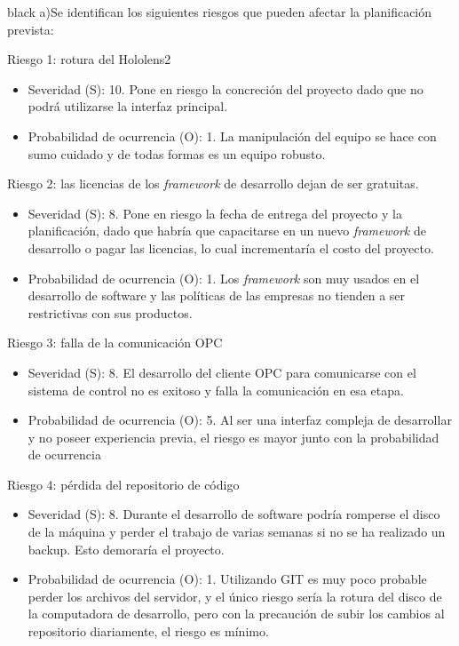 \documentclass[11pt]{charter}
\begin{document}
\begin{consigna}{black}
a)Se identifican los siguientes riesgos que pueden afectar la planificación prevista:
 
Riesgo 1: rotura del Hololens2
\begin{itemize}
\item Severidad (S): 10. Pone en riesgo la concreción del proyecto dado que no podrá utilizarse la interfaz principal.\\
\item Probabilidad de ocurrencia (O): 1. La manipulación del equipo se hace con sumo cuidado y de todas formas es un equipo robusto.\\ 
\end{itemize}   

Riesgo 2: las licencias de los \textit{framework} de desarrollo dejan de ser gratuitas.
\begin{itemize}
\item Severidad (S): 8. Pone en riesgo la fecha de entrega del proyecto y la planificación, dado que habría que capacitarse en un nuevo \textit{framework} de desarrollo o pagar las licencias, lo cual incrementaría el costo del proyecto.\\
\item Probabilidad de ocurrencia (O): 1. Los \textit{framework} son muy usados en el desarrollo de software y las políticas de las empresas no tienden a ser restrictivas con sus productos.\\ 
\end{itemize}   

Riesgo 3: falla de la comunicación OPC
\begin{itemize}
\item Severidad (S): 8. El desarrollo del cliente OPC para comunicarse con el sistema de control no es exitoso y falla la comunicación en esa etapa.\\
\item Probabilidad de ocurrencia (O): 5. Al ser una interfaz compleja de desarrollar y no poseer experiencia previa, el riesgo es mayor junto con la probabilidad de ocurrencia\\ 
\end{itemize}   

Riesgo 4: pérdida del repositorio de código
\begin{itemize}
\item Severidad (S): 8. Durante el desarrollo de software podría romperse el disco de la máquina y perder el trabajo de varias semanas si no se ha realizado un backup. Esto demoraría el proyecto.\\
\item Probabilidad de ocurrencia (O): 1. Utilizando GIT es muy poco probable perder los archivos del servidor, y el único riesgo sería la rotura del disco de la computadora de desarrollo, pero con la precaución de subir los cambios al repositorio diariamente, el riesgo es mínimo.\\ 
\end{itemize}   


\end{consigna}
\end{document}
